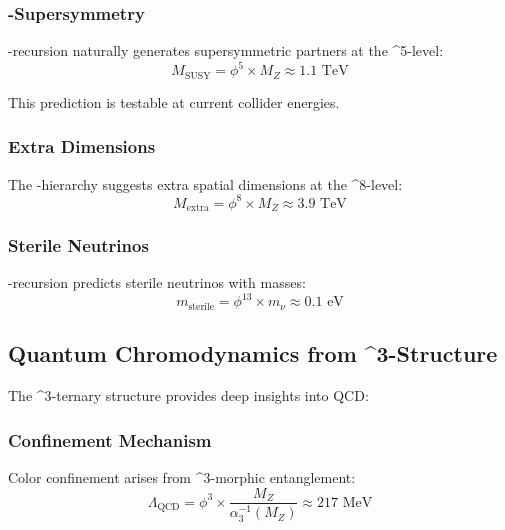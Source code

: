 \subsubsection{\phi-Supersymmetry}

\begin{theorem}
\phi-recursion naturally generates supersymmetric partners at the \phi^5-level:
\begin{equation}
M_{\text{SUSY}} = \phi^5 \times M_Z \approx 1.1 \text{ TeV}
\label{eq:phi_susy_scale}
\end{equation}
\end{theorem}

This prediction is testable at current collider energies.

\subsubsection{Extra Dimensions}

The \phi-hierarchy suggests extra spatial dimensions at the \phi^8-level:
\begin{equation}
M_{\text{extra}} = \phi^8 \times M_Z \approx 3.9 \text{ TeV}
\end{equation}

\subsubsection{Sterile Neutrinos}

\phi-recursion predicts sterile neutrinos with masses:
\begin{equation}
m_{\text{sterile}} = \phi^{13} \times m_{\nu} \approx 0.1 \text{ eV}
\end{equation}

\subsection{Quantum Chromodynamics from \phi^3-Structure}

The \phi^3-ternary structure provides deep insights into QCD:

\subsubsection{Confinement Mechanism}

\begin{theorem}
Color confinement arises from \phi^3-morphic entanglement:
\begin{equation}
\Lambda_{\text{QCD}} = \phi^3 \times \frac{M_Z}{\alpha_3^{-1}(M_Z)} \approx 217 \text{ MeV}
\label{eq:phi_lambda_qcd}
\end{equation}
\end{theorem}

